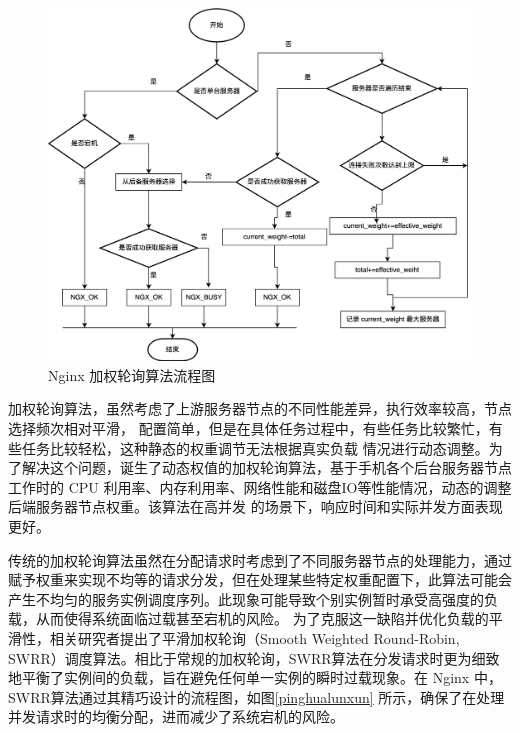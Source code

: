 \begin{figure}[htb]
	\centering
	\includegraphics[width=\textwidth]{figures/round-flowchart.png}
	\caption{Nginx 加权轮询算法流程图}
	\label{weight_round}
\end{figure}

加权轮询算法，虽然考虑了上游服务器节点的不同性能差异，执行效率较高，节点选择频次相对平滑，
配置简单，但是在具体任务过程中，有些任务比较繁忙，有些任务比较轻松，这种静态的权重调节无法根据真实负载
情况进行动态调整。为了解决这个问题，诞生了动态权值的加权轮询算法，基于手机各个后台服务器节点工作时的 CPU
利用率、内存利用率、网络性能和磁盘IO等性能情况，动态的调整后端服务器节点权重\cite{谭畅2021云中心基于}。该算法在高并发
的场景下，响应时间和实际并发方面表现更好。

传统的加权轮询算法虽然在分配请求时考虑到了不同服务器节点的处理能力，通过赋予权重来实现不均等的请求分发，但在处理某些特定权重配置下，此算法可能会产生不均匀的服务实例调度序列。此现象可能导致个别实例暂时承受高强度的负载，从而使得系统面临过载甚至宕机的风险。
为了克服这一缺陷并优化负载的平滑性，相关研究者提出了平滑加权轮询（Smooth Weighted Round-Robin, SWRR）调度算法。相比于常规的加权轮询，SWRR算法在分发请求时更为细致地平衡了实例间的负载，旨在避免任何单一实例的瞬时过载现象。在 Nginx 中，SWRR算法通过其精巧设计的流程图，如图\ref{pinghualunxun} 所示，确保了在处理并发请求时的均衡分配，进而减少了系统宕机的风险。

